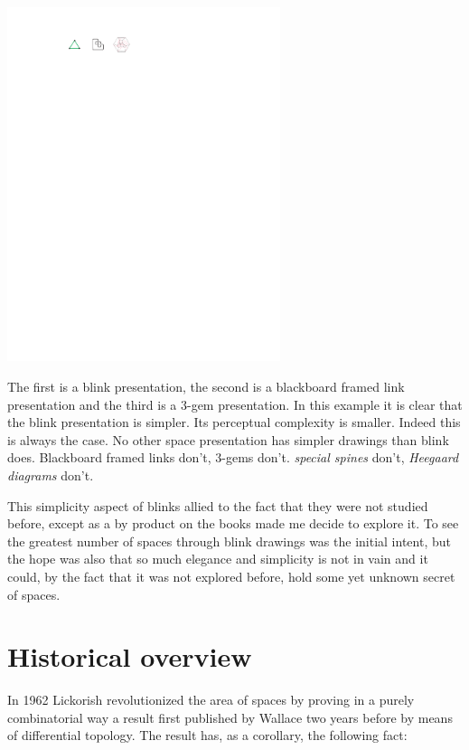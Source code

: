 \begin{center}
\includegraphics[width=8cm]{fig/presentations.pdf}
\end{center}
The first is a blink presentation, the second is a blackboard
framed link presentation and the third is a 3-gem presentation.
In this example it is clear that the blink presentation is
simpler. Its perceptual complexity is smaller. Indeed this is
always the case. No other space presentation has simpler drawings
than blink does. Blackboard framed links don't, 3-gems don't.
{\it special spines} don't, {\it Heegaard diagrams} don't.

This simplicity aspect of blinks allied to the fact that they were
not studied before, except as a by product on the books
\cite{KauffmanAndLins1994, Lins1995} made me decide to explore it.
To see the greatest number of spaces through blink
drawings was the initial intent, but the hope was also that
so much elegance and simplicity is not in vain and it could,
by the fact that it was not explored before, hold
some yet unknown secret of spaces.

\section{Historical overview}
\label{sec:historicalOverview}

In 1962 Lickorish \cite{Lickorish1962} revolutionized the area of
spaces by proving in a purely combinatorial way a result first
published by Wallace \cite{Wallace1960} two years before by means of
differential topology. The result has, as a corollary, the following
fact:


